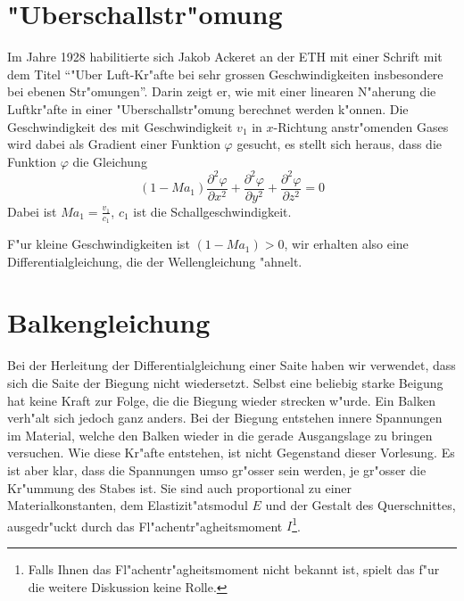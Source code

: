 \section{"Uberschallstr"omung}
Im Jahre 1928 habilitierte sich Jakob Ackeret an der ETH mit einer
Schrift mit dem Titel ``"Uber Luft-Kr"afte bei sehr grossen
Geschwindigkeiten insbesondere bei ebenen Str"omungen''. Darin
zeigt er, wie mit einer linearen N"aherung die Luftkr"afte
in einer "Uberschallstr"omung berechnet werden k"onnen.
Die Geschwindigkeit des mit Geschwindigkeit $v_1$ in $x$-Richtung
anstr"omenden
Gases wird dabei als Gradient einer Funktion $\varphi$ gesucht,
es stellt sich heraus, dass die Funktion $\varphi$ die Gleichung
\[
(1-Ma_1)\frac{\partial^2\varphi}{\partial x^2}
+
\frac{\partial^2\varphi}{\partial y^2}
+
\frac{\partial^2\varphi}{\partial z^2}=0
\]
Dabei ist $Ma_1=\frac{v_1}{c_1}$, $c_1$ ist die Schallgeschwindigkeit.

F"ur kleine Geschwindigkeiten ist $(1-Ma_1)>0$, wir erhalten also eine
Differentialgleichung, die der Wellengleichung "ahnelt.

\section{Balkengleichung}
Bei der Herleitung der Differentialgleichung einer Saite haben
wir verwendet, dass sich die Saite der Biegung nicht wiedersetzt.
Selbst eine beliebig starke Beigung hat keine Kraft zur Folge, die
die Biegung wieder strecken w"urde.
Ein Balken verh"alt sich jedoch ganz anders. Bei der Biegung entstehen
innere Spannungen im Material, welche den Balken wieder in die
gerade Ausgangslage zu bringen versuchen.
Wie diese Kr"afte entstehen, ist nicht Gegenstand dieser Vorlesung.
Es ist aber klar, dass die Spannungen umso gr"osser sein werden,
je gr"osser die Kr"ummung des Stabes ist. Sie sind auch proportional
zu einer Materialkonstanten, dem Elastizit"atsmodul $E$ und der
Gestalt des Querschnittes, ausgedr"uckt durch das Fl"achentr"agheitsmoment
$I$\footnote{Falls Ihnen das Fl"achentr"agheitsmoment nicht bekannt ist,
spielt das f"ur die weitere Diskussion keine Rolle.}.

